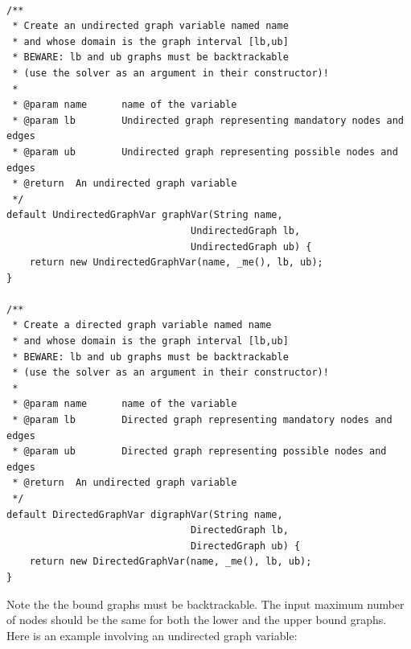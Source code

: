 \documentclass{article}
\begin{document}
\begin{lstlisting}

/**
 * Create an undirected graph variable named name
 * and whose domain is the graph interval [lb,ub]
 * BEWARE: lb and ub graphs must be backtrackable
 * (use the solver as an argument in their constructor)!
 *
 * @param name		name of the variable
 * @param lb		Undirected graph representing mandatory nodes and edges
 * @param ub		Undirected graph representing possible nodes and edges
 * @return	An undirected graph variable
 */
default UndirectedGraphVar graphVar(String name, 
								UndirectedGraph lb, 
								UndirectedGraph ub) {
	return new UndirectedGraphVar(name, _me(), lb, ub);
}

/**
 * Create a directed graph variable named name
 * and whose domain is the graph interval [lb,ub]
 * BEWARE: lb and ub graphs must be backtrackable
 * (use the solver as an argument in their constructor)!
 *
 * @param name		name of the variable
 * @param lb		Directed graph representing mandatory nodes and edges
 * @param ub		Directed graph representing possible nodes and edges
 * @return	An undirected graph variable
 */
default DirectedGraphVar digraphVar(String name, 
								DirectedGraph lb, 
								DirectedGraph ub) {
	return new DirectedGraphVar(name, _me(), lb, ub);
}
\end{lstlisting}

Note the the bound graphs must be backtrackable. The input maximum number of nodes should be the same for both the lower and the upper bound graphs. 
%
%
Here is an example involving an undirected graph variable:
\end{document}
